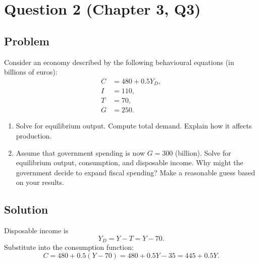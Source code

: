 \documentclass[12pt]{article}
\begin{document}
\newpage

\section*{Question 2 (Chapter 3, Q3)}

\subsection*{Problem}

Consider an economy described by the following behavioural equations (in billions of euros):
\begin{align*}
C &= 480 + 0.5Y_D,\\
I &= 110,\\
T &= 70,\\
G &= 250.
\end{align*}

\begin{enumerate}[label=(\alph*)]
\item Solve for equilibrium output. Compute total demand. Explain how it affects production.
\item Assume that government spending is now \(G = 300\) (billion). Solve for equilibrium output, consumption, and disposable income. Why might the government decide to expand fiscal spending? Make a reasonable guess based on your results.
\end{enumerate}

\subsection*{Solution}

Disposable income is
\[
Y_D = Y - T = Y - 70.
\]
Substitute into the consumption function:
\[
C = 480 + 0.5(Y-70) = 480 + 0.5Y - 35 = 445 + 0.5Y.
\]
\end{document}
